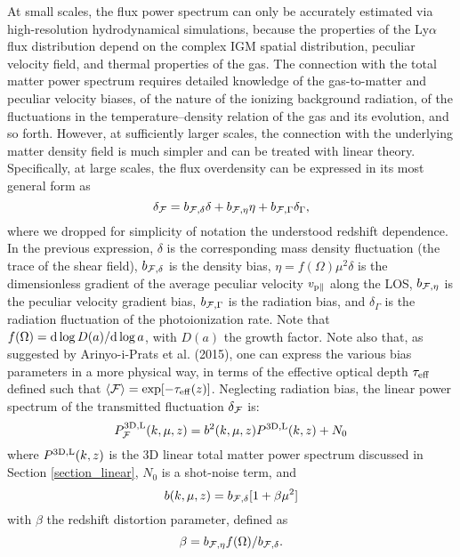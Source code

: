 \documentclass{emulateapj}
\begin{document}
At small scales,  the  flux power spectrum can only be accurately estimated via high-resolution
hydrodynamical simulations, because  the properties of the 
Ly$\alpha$ flux distribution depend on the complex IGM spatial distribution, 
peculiar velocity field, and thermal properties of the gas.
The connection  with the total matter power spectrum requires 
detailed knowledge of the gas-to-matter and peculiar velocity biases, 
of the nature of the
ionizing background radiation, of the fluctuations in the 
temperature--density relation of the gas and its evolution, and so forth. 
However, at sufficiently larger scales, the connection with the underlying matter density field is much simpler and can be treated with linear theory.
Specifically, at large scales, the flux overdensity can be expressed in its most general form as
\begin{equation}
\delta_{{\cal{F}}} = b_{{\cal{F}},\delta} \delta + b_{{\cal{F}},\eta} \eta + b_{{\cal{F}},\Gamma} \delta_{\Gamma},
\label{}
\end{equation}
where we dropped for simplicity of notation the understood redshift dependence. 
In the previous expression,  
$\delta$ is the corresponding mass density fluctuation (the trace of the shear field),
$b_{{ \cal{F}},\delta}$ is the density bias, 
$\eta = f(\Omega) \mu^2 \delta$ is the dimensionless gradient of the average peculiar velocity $v_{\rm p \parallel}$
along the LOS,
$b_{{ \cal{F}},\eta}$ is the peculiar velocity gradient bias,
$b_{{ \cal{F}},\Gamma}$ is the radiation bias, and
$\delta_{\Gamma}$ is the radiation fluctuation of the photoionization rate.
Note that $f(\Omega) = {\rm d} \log D(a) /{\rm d} \log a$, with $D(a)$ the growth factor.
Note also that, as suggested by Arinyo-i-Prats et al. (2015),  one can express 
the various bias parameters in a more physical way, in terms 
of the effective optical depth $\tau_{\rm eff}$ defined 
such that
$\langle {{\cal{F}}} \rangle = \exp [ -\tau_{\rm eff} (z) ]$.
Neglecting radiation bias, the linear power spectrum of the transmitted fluctuation $\delta_{{\cal{F}}}$ is:
\begin{equation}
P^{\rm 3D, L}_{{\cal{F}}}  (k, \mu,z) = b^2(k,\mu, z) P^{\rm 3D,L}(k,z) + N_0 
\label{eq_linear_flux_ps}
\end{equation}
where $P^{\rm 3D,L}(k,z)$
is the 3D linear total matter power spectrum discussed in Section \ref{section_linear},
$N_0$ is a shot-noise term, 
and
\begin{equation} 
b(k,\mu, z) = b_{{ \cal{F}},\delta} [1 + \beta \mu^2 ] 
\label{}
\end{equation}
with
$\beta$ the redshift distortion parameter, defined as
\begin{equation}
\beta = b_{{ \cal{F}},\eta} f(\Omega) / b_{{ \cal{F}},\delta}.
\label{}
\end{equation}
 
\end{document}
